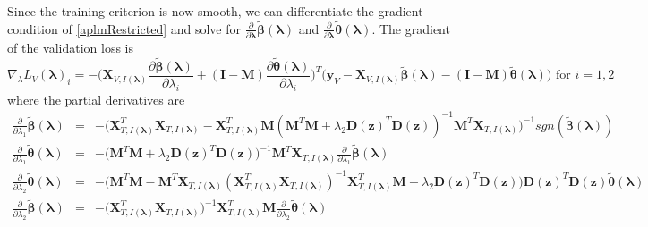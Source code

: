 \documentclass[10pt,letterpaper]{article}
\begin{document}
Since the training criterion is now smooth, we can differentiate the gradient condition of \eqref{aplmRestricted} and solve for $\frac{\partial}{\partial \boldsymbol \lambda} \tilde{\boldsymbol\beta}(\boldsymbol{\lambda}) $ and $\frac{\partial}{\partial \boldsymbol \lambda} \tilde{\boldsymbol\theta}(\boldsymbol{\lambda}) $. The gradient of the validation loss is
\begin{equation*}
\nabla_\lambda L_V(\boldsymbol{\lambda})_i =
- \bigg(
\boldsymbol{X}_{V, I(\boldsymbol\lambda)} \frac{\partial \tilde{\boldsymbol\beta}(\boldsymbol{\lambda})}{\partial \lambda_i}
+ (\boldsymbol I - \boldsymbol{M}) \frac{\partial \tilde{\boldsymbol\theta}(\boldsymbol{\lambda})}{\partial \lambda_i}
\bigg )^T
\bigg (
\boldsymbol{y}_V
- \boldsymbol{X}_{V, I(\boldsymbol\lambda)} \tilde{\boldsymbol\beta}(\boldsymbol{\lambda})
- (\boldsymbol I - \boldsymbol{M}) \tilde{\boldsymbol\theta}(\boldsymbol{\lambda})
\bigg )
\text{ for } i = 1,2 
\end{equation*}
where the partial derivatives are
\begin{equation*}
\begin{array}{lcl}
\frac{\partial}{\partial \lambda_1} \tilde{\boldsymbol\beta}(\boldsymbol{\lambda})  &=&
-\bigg(\boldsymbol{X}_{T, I(\boldsymbol\lambda)}^T \boldsymbol{X}_{T, I(\boldsymbol\lambda)}
- \boldsymbol{X}_{T, I(\boldsymbol\lambda)}^T \boldsymbol{M}(\boldsymbol{M}^T \boldsymbol{M}
+ \lambda_2 \boldsymbol{D}(\boldsymbol{z})^T\boldsymbol{D}(\boldsymbol{z}))^{-1} \boldsymbol{M}^T \boldsymbol{X}_{T, I(\boldsymbol\lambda)} \bigg)^{-1} 
sgn( \tilde{\boldsymbol\beta}(\boldsymbol{\lambda})) \\
\frac{\partial }{\partial \lambda_1} \tilde{\boldsymbol\theta}(\boldsymbol{\lambda}) &=&
-\bigg(\boldsymbol{M}^T \boldsymbol{M}
+ \lambda_2 \boldsymbol{D}(\boldsymbol{z})^T \boldsymbol{D}(\boldsymbol{z})\bigg)^{-1}
\boldsymbol{M}^T \boldsymbol{X}_{T, I(\boldsymbol\lambda)} \frac{\partial}{\partial \lambda_1} \tilde{\boldsymbol\beta}(\boldsymbol{\lambda})
\\
\frac{\partial}{\partial \lambda_2}  \tilde{\boldsymbol\theta}(\boldsymbol{\lambda}) &=&
-\bigg(\boldsymbol{M}^T \boldsymbol{M}
- \boldsymbol{M}^T \boldsymbol{X}_{T, I(\boldsymbol\lambda)} (\boldsymbol{X}_{T, I(\boldsymbol\lambda)}^T\boldsymbol{X}_{T, I(\boldsymbol\lambda)})^{-1} \boldsymbol{X}_{T, I(\boldsymbol\lambda)}^T \boldsymbol{M} + \lambda_2 \boldsymbol{D}(\boldsymbol{z})^T\boldsymbol{D}(\boldsymbol{z}) \bigg)
\boldsymbol{D}(\boldsymbol{z})^T\boldsymbol{D}(\boldsymbol{z}) \tilde{\boldsymbol\theta}(\boldsymbol{\lambda})
\\
\frac{\partial}{\partial \lambda_2} \tilde{\boldsymbol\beta}(\boldsymbol{\lambda}) &=&
- \bigg( \boldsymbol{X}_{T, I(\boldsymbol\lambda)}^T\boldsymbol{X}_{T, I(\boldsymbol\lambda)}\bigg)^{-1}
\boldsymbol{X}_{T, I(\boldsymbol\lambda)}^T \boldsymbol{M}
\frac{\partial}{\partial \lambda_2}  \tilde{\boldsymbol\theta}(\boldsymbol{\lambda})\\
\end{array}
\end{equation*}
\end{document}
